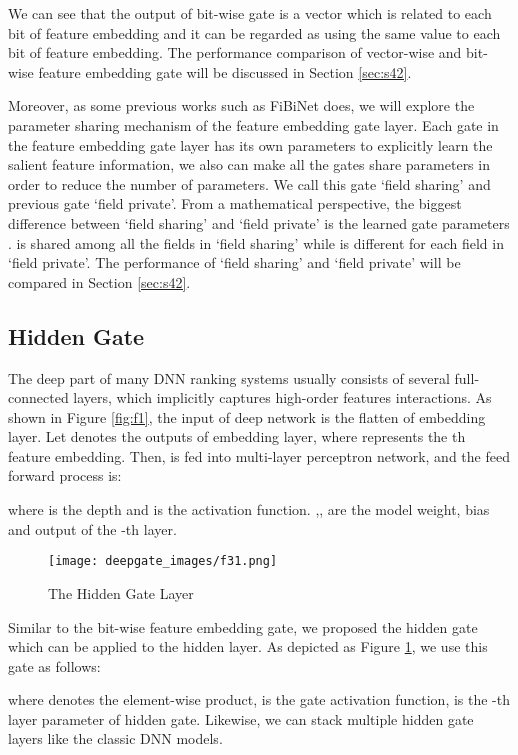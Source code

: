 \documentclass[sigconf,nonacm=true]{acmart}
\begin{document}
We can see that the output of bit-wise gate is a vector which is related to each bit of feature embedding and it can be regarded as using the same value to each bit of feature embedding. The performance comparison of vector-wise and bit-wise feature embedding gate will be discussed in Section \ref{sec:s42}.

Moreover, as some previous works such as FiBiNet\cite{DBLP:conf/recsys/HuangZZ19} does, we will explore the parameter sharing mechanism of the feature embedding gate layer. 
Each gate in the feature embedding gate layer has its own parameters to explicitly learn the salient feature information, 
we also can make all the gates share parameters in order to reduce the number of parameters. 
We call this gate  `field sharing' and previous gate `field private'.
From a mathematical perspective, the biggest difference between `field sharing' and `field private' is the learned gate parameters . 
 is shared among all the fields in `field sharing' while  is different for each field in `field private'.
The performance of `field sharing' and `field private' will be compared in Section \ref{sec:s42}.

\subsection{Hidden Gate}
\label{sec:s35}
The deep part of many DNN ranking systems usually consists of several full-connected layers, which implicitly captures high-order features interactions. 
As shown in Figure \ref{fig:f1}, the input of deep network is the flatten of embedding layer. 
Let  denotes the outputs of embedding layer, where  represents the th feature embedding. 
Then,  is fed into multi-layer perceptron network, and the feed forward process is:

where  is the depth and  is the activation function. ,, are the model weight, bias
and output of the -th layer. 

\begin{figure}[hbt!]
\texttt{[image: deepgate\_images/f31.png]}
  \caption{The Hidden Gate Layer}
  \label{fig:d1}
\end{figure}


Similar to the bit-wise feature embedding gate, we proposed the hidden gate which can be applied to the hidden layer. As depicted as Figure \ref{fig:d1}, we use this gate as follows:

where  denotes the element-wise product,  is the gate activation function,  is the -th layer parameter of hidden gate. Likewise, we can stack multiple hidden gate layers like the classic DNN models.
\end{document}
